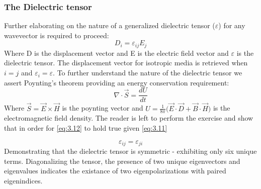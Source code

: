 \subsubsection{The Dielectric tensor}
Further elaborating on the nature of a generalized dielectric tensor ($\varepsilon$) for any wavevector is required to proceed:
\begin{equation}\label{eq:3.11}
D_i = \varepsilon_{ij}E_j
\end{equation}
Where D is the displacement vector and E is the electric field vector and $\varepsilon$ is the dielectric tensor. The displacement vector for isotropic media is retrieved when $i = j$ and $\varepsilon_i = \varepsilon$. To further understand the nature of the dielectric tensor we assert Poynting's theorem providing an energy conservation requirement:
\begin{equation}\label{eq:3.12}
\nabla \cdot \vec{S} = \frac{dU}{dt}
\end{equation}
Where $\vec{S} = \vec{E} \times \vec{H}$ is the poynting vector and $U = \frac{1}{8 \pi} \big( \vec{E} \cdot \vec{D} + \vec{B} \cdot \vec{H} \big)$ is the electromagnetic field density. The reader is left to perform the exercise and show that in order for \ref{eq:3.12} to hold true given \ref{eq:3.11}


\begin{equation}
\varepsilon_{ij} = \varepsilon_{ji}
\end{equation}
Demonstrating that the dielectric tensor is symmetric - exhibiting only six unique terms. Diagonalizing the tensor, the presence of two unique eigenvectors and eigenvalues indicates the existance of two eigenpolarizations with paired eigenindices.


